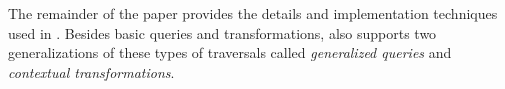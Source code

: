 

The remainder of the paper provides the details and implementation
techniques used in \Name. Besides basic queries and transformations,
\name also supports two generalizations of these types of traversals 
called \emph{generalized queries} and \emph{contextual transformations}.
